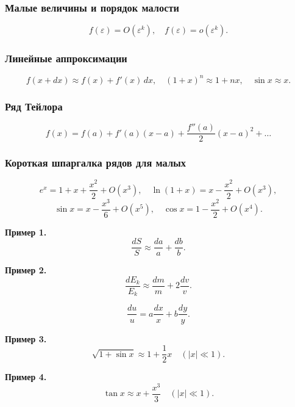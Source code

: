 \documentclass[12pt, a4paper]{article}
\begin{document}
\subsubsection*{Малые величины и порядок малости}
\[
f(\varepsilon)=O(\varepsilon^k), \quad f(\varepsilon)=o(\varepsilon^k).
\]

\subsubsection*{Линейные аппроксимации}
\[
f(x+dx)\approx f(x)+f'(x)\,dx, \quad (1+x)^n \approx 1+n x, \quad \sin x\approx x.
\]

\subsubsection*{Ряд Тейлора}
\[
f(x)=f(a)+f'(a)(x-a)+\frac{f''(a)}{2}(x-a)^2+\dots
\]

\subsubsection*{Короткая шпаргалка рядов для малых}
\[
e^{x}=1+x+\frac{x^{2}}{2}+O(x^{3}), \quad \ln(1+x)=x-\frac{x^{2}}{2}+O(x^{3}),
\]
\[
\sin x=x-\frac{x^{3}}{6}+O(x^{5}), \quad \cos x=1-\frac{x^{2}}{2}+O(x^{4}).
\]

\textbf{Пример 1.}
\[
\frac{dS}{S}\approx \frac{da}{a}+\frac{db}{b}.
\]

\textbf{Пример 2.}
\[
\frac{dE_k}{E_k}\approx \frac{dm}{m}+2\frac{dv}{v}.
\]

\[
\frac{du}{u} = a\frac{dx}{x}+b\frac{dy}{y}.
\]

\textbf{Пример 3.}
\[
\boxed{\sqrt{1+\sin x}\approx 1+\frac12 x \quad (|x|\ll1).}
\]

\textbf{Пример 4.}
\[
\boxed{\tan x \approx x + \frac{x^3}{3} \quad (|x|\ll 1).}
\]
\end{document}
